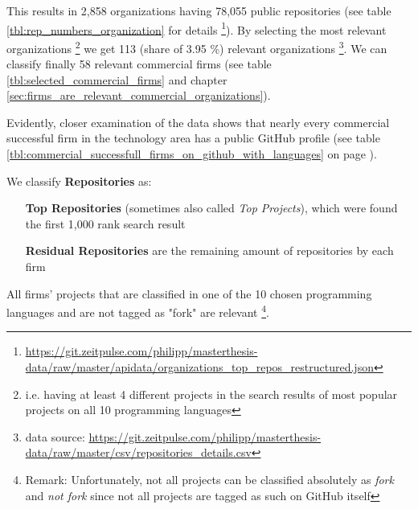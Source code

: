 This results in 2,858 organizations having 78,055 public repositories (see table \ref{tbl:rep_numbers_organization} for details  \footnote{\url{https://git.zeitpulse.com/philipp/masterthesis-data/raw/master/apidata/organizations_top_repos_restructured.json}}). By selecting the most relevant organizations \footnote{i.e. having at least 4 different projects in the search results of most popular projects on all 10 programming languages} we get 113 (share of 3.95 \%) relevant organizations \footnote{data source: \url{https://git.zeitpulse.com/philipp/masterthesis-data/raw/master/csv/repositories_details.csv}}. We can classify finally 58 relevant commercial firms (see table \ref{tbl:selected_commercial_firms} and chapter \ref{sec:firms_are_relevant_commercial_organizations}).

Evidently, closer examination of the data shows that nearly every commercial successful firm in the technology area has a public GitHub profile (see table \ref{tbl:commercial_successfull_firms_on_github_with_languages} on page \pageref{tbl:commercial_successfull_firms_on_github_with_languages}).
%

\label{sec:top_and_residual_projects}

We classify \textbf{Repositories} as:

\begin{itemize}
	\item[\textbf{Top Repositories}] (sometimes also called \textit{Top Projects}), which were found the first 1,000 rank search result
	\item[\textbf{Residual Repositories}] are the remaining amount of repositories by each firm
\end{itemize}

All firms' projects that are classified in one of the 10 chosen programming languages and are not tagged as "fork" are relevant \footnote{Remark: Unfortunately, not all projects can be classified absolutely as \textit{fork} and \textit{not fork} since not all projects are tagged as such on GitHub itself}.

